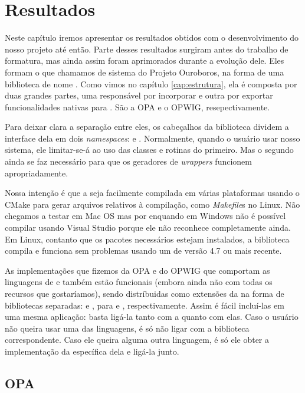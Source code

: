 \chapter{Resultados}
\label{cap:resultados}

Neste capítulo iremos apresentar os resultados obtidos com o
desenvolvimento do nosso projeto até então. Parte desses resultados
surgiram antes do trabalho de formatura, mas ainda assim foram aprimorados
durante a evolução dele. Eles formam o que chamamos de sistema do
Projeto Ouroboros, na forma de uma biblioteca \CXX{} de nome
. Como vimos no capítulo \ref{cap:estrutura},
ela é composta por duas grandes partes, uma responsável por incorporar
 e outra por exportar funcionalidades nativas para .
São a OPA e o OPWIG, resepectivamente.

Para deixar clara a separação entre eles, os cabeçalhos da biblioteca
dividem a interface dela em dois \textit{namespaces}:  e .
Normalmente, quando o usuário usar nosso sistema, ele limitar-se-á ao uso
das classes e rotinas do primeiro. Mas o segundo ainda se faz necessário
para que os geradores de \textit{wrappers} funcionem apropriadamente.

Nossa intenção é que a  seja facilmente compilada em várias plataformas
usando o CMake para gerar arquivos relativos à compilação, como \textit{Makefile}s
no Linux. Não chegamos a testar em Mac OS mas por enquando em Windows não é
possível compilar usando Visual Studio porque ele não reconhece  completamente
ainda. Em Linux, contanto que os pacotes necessários estejam instalados, a biblioteca
compila e funciona sem problemas usando um  de versão 4.7 ou mais recente.

As implementações que fizemos da OPA e do OPWIG que comportam as linguagens de
\script{}  e  também estão funcionais (embora ainda não
com todas os recursos que gostaríamos), sendo distríbuidas como extensões
da  na forma de bibliotecas separadas: 
e , para  e , respectivamente.
Assim é fácil incluí-las em uma mesma aplicação: basta ligá-la tanto com a
 quanto com elas. Caso o usuário não queira usar uma das linguagens,
é só não ligar com a biblioteca correspondente. Caso ele queira alguma outra
linguagem, é só ele obter a implementação da  específica dela
e ligá-la junto.

\section{OPA}
\label{cap:resultados:opa}

